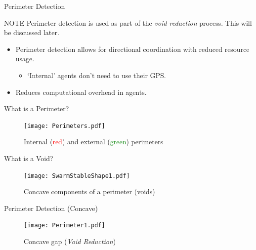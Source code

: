 \documentclass{beamer}
\begin{document}


\begin{frame}{Perimeter Detection}
  \begin{block}{NOTE}
    Perimeter detection is used as part of the \textit{void reduction} process. This will be discussed later. 
  \end{block}
  \begin{itemize}
    \item Perimeter detection allows for directional coordination with reduced resource usage.
      \begin{itemize}
        \item `Internal' agents don't need to use their GPS.
      \end{itemize}
    \item Reduces computational overhead in agents.
  \end{itemize}
\end{frame}

\begin{frame}{What is a Perimeter?}
  \begin{figure}
    \begin{center}
      \texttt{[image: Perimeters.pdf]}
    \end{center}
    \caption{Internal (\textcolor{red}{red}) and external (\textcolor{green}{green}) perimeters}
  \end{figure}
\end{frame}

\begin{frame}{What is a Void?}
  \begin{figure}
    \begin{center}
      \texttt{[image: SwarmStableShape1.pdf]}
    \end{center}
    \caption{Concave components of a perimeter (voids)}
  \end{figure}
\end{frame}

\begin{frame}{Perimeter Detection (Concave)}
  \begin{figure}
    \begin{center}
      \texttt{[image: Perimeter1.pdf]}
    \end{center}
    \caption{Concave gap (\textit{Void Reduction})}
  \end{figure}
\end{frame}
\end{document}
